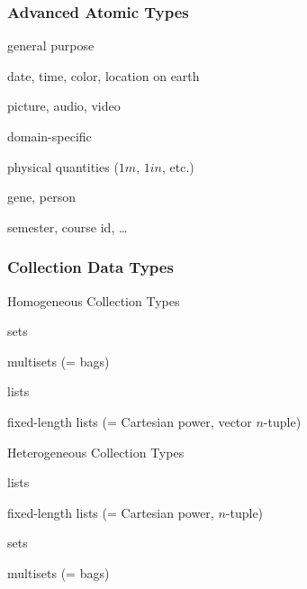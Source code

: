 \begin{frame}\frametitle{Advanced Atomic Types}

\begin{blockitems}{general purpose}
 \item date, time, color, location on earth
 \item picture, audio, video
\end{blockitems}

\begin{blockitems}{domain-specific}
 \item physical quantities ($1m$, $1in$, etc.)
 \item gene, person
 \item semester, course id, \ldots
\end{blockitems}

\end{frame}

\begin{frame}\frametitle{Collection Data Types}
\begin{blockitems}{Homogeneous Collection Types}
 \item sets
 \item multisets (= bags)
 \item lists
 \item fixed-length lists (= Cartesian power, vector $n$-tuple)
\end{blockitems}

\begin{blockitems}{Heterogeneous Collection Types}
 \item lists
 \item fixed-length lists (= Cartesian power, $n$-tuple)
 \item sets
 \item multisets (= bags)
\end{blockitems}
\end{frame}

